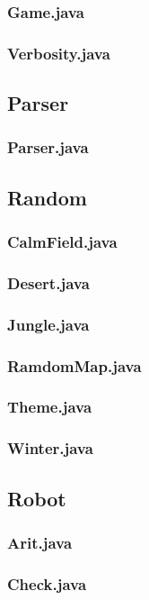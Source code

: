 \documentclass[a4paper]{article}
\begin{document}
		\subsubsection{ Game.java     }
		\subsubsection{ Verbosity.java}
		
	\subsection{Parser}
		\subsubsection{ Parser.java }
		
	\subsection{Random}
		\subsubsection{ CalmField.java }
		\subsubsection{ Desert.java }
		\subsubsection{ Jungle.java }
		\subsubsection{ RamdomMap.java }
		\subsubsection{ Theme.java }
		\subsubsection{ Winter.java }
	
	\subsection{Robot}
		\subsubsection{ Arit.java }
		\subsubsection{ Check.java }
\end{document}
